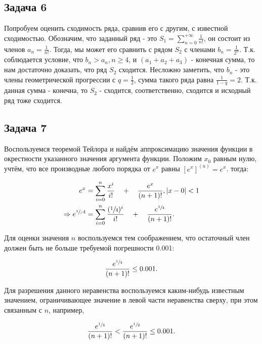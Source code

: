 \documentclass[a4paper,11pt]{article}
\begin{document}
\subsection{Задача 6}

Попробуем оценить сходимость ряда, сравнив его с другим, с известной сходимостью. Обозначим, что заданный ряд - это $S_1 = \sum_{n=0}^{+\infty}\frac{1}{n!}$, он состоит из членов $a_n = \frac{1}{n!}$. Тогда, мы может его сравнить с рядом $S_2$ с членами $b_n = \frac{1}{2^n}$. Т.к. соблюдается условие, что $b_n > a_n, n \geq 4$, и $(a_1 + a_2 + a_3)$ - конечная сумма, то нам достаточно доказать, что ряд $S_2$ сходится. Несложно заметить, что $b_n$ - это члены геометрической прогрессии с $q = \frac{1}{2}$, сумма такого ряда равна $\frac{1}{1-q} = 2$. Т.к. данная сумма - конечна, то $S_2$ - сходится, соответственно, сходится и исходный ряд тоже сходится.

\subsection{Задача 7}

Воспользуемся теоремой Тейлора и найдём аппроксимацию значения функции в окрестности указанного значения аргумента функции. Положим $x_0$ равным нулю, учтём, что все производные любого порядка от $e^x$ равны $[e^x]^{(n)} = e^x$.  тогда:

\begin{align*}
e^x & = \sum_{i=0}^{n} \frac{x^i}{i!} \quad + \quad \frac{e^x}{(n+1)!}, |x -0| < 1 \\
\Rightarrow
e^{\sfrac{1}/{4}} & = \sum_{i=0}^{n} \frac{(\sfrac{1}{4})^i}{i!} \quad + \quad \frac{e^{\sfrac{1}{4}}}{(n+1)!}.
\end{align*}

Для оценки значения $n$ воспользуемся тем соображением, что остаточный член должен быть не больше требуемой погрешности 0.001:

\begin{align*}
\frac{e^{\sfrac{1}{4}}}{(n+1)!} \leq 0.001.
\end{align*}

Для разрешения данного неравенства воспользуемся каким-нибудь известным значением, ограничивающее значение в левой части неравенства сверху, при этом связанным с $n$, например,

\begin{align*}
\frac{e^{\sfrac{1}{4}}}{(n+1)!} < \frac{e^{\sfrac{1}{2}}}{(n+1)!} \leq 0.001.
\end{align*}
\end{document}
